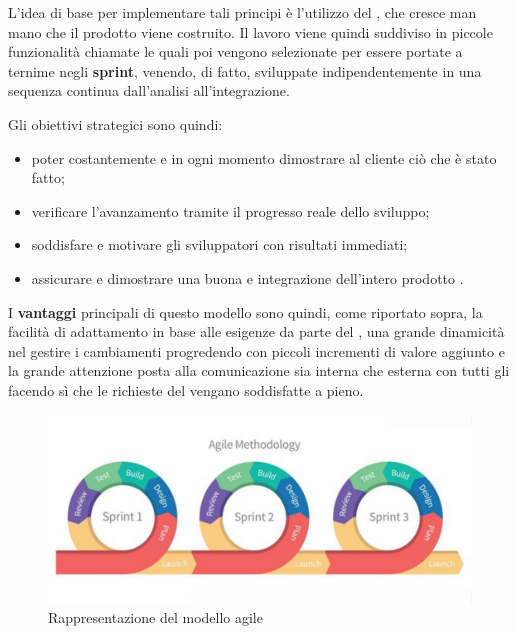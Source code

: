 L’idea di base per implementare tali principi è l’utilizzo del \textbf{}, che cresce man mano che il prodotto viene costruito. \newline
Il lavoro viene quindi suddiviso in piccole funzionalità chiamate \textbf{} le quali poi vengono selezionate per essere portate a ternime negli \textbf{sprint}, venendo, di fatto, sviluppate indipendentemente in una sequenza continua dall’analisi all’integrazione. \newline

Gli obiettivi strategici sono quindi:
\begin{itemize}
    \item poter costantemente e in ogni momento dimostrare al cliente ciò che è stato fatto;
    \item verificare l’avanzamento tramite il progresso reale dello sviluppo;
    \item soddisfare e motivare gli sviluppatori con risultati immediati;
    \item assicurare e dimostrare una buona  e integrazione dell’intero prodotto .
\end{itemize}

I \textbf{vantaggi} principali di questo modello sono quindi, come riportato sopra, la facilità di adattamento in base alle esigenze da parte del , 
una grande dinamicità nel gestire i cambiamenti progredendo con piccoli incrementi di valore aggiunto 
e la grande attenzione posta alla comunicazione sia interna che esterna con tutti gli  facendo sì che le richieste del \proponente{} vengano soddisfatte a pieno.

\begin{figure}[H]
    \centering
    \includegraphics[scale = 0.25]{components/img/agile.png}
    \caption{Rappresentazione del modello agile}
    \label{fig:Rappresentazione del modello agile}
\end{figure}


